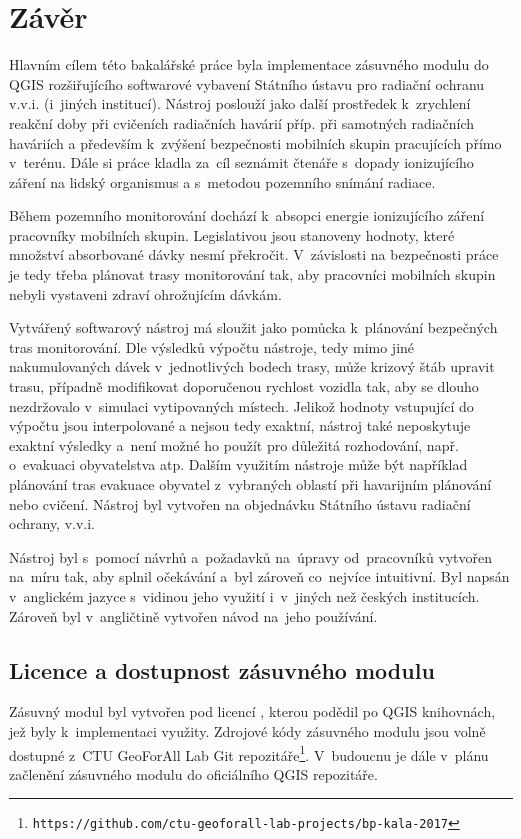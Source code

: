 \chapter{Závěr}
\label{5-zaver}

Hlavním cílem této bakalářské práce byla implementace zásuvného modulu
do QGIS rozšiřujícího softwarové vybavení Státního ústavu pro radiační
ochranu v.v.i. (i~jiných institucí). Nástroj poslouží jako další
prostředek k~zrychlení reakční doby při cvičeních radiačních havárií
příp. při samotných radiačních haváriích a především k~zvýšení
bezpečnosti mobilních skupin pracujících přímo v~terénu. Dále si práce
kladla za~cíl seznámit čtenáře s~dopady ionizujícího záření na lidský
organismus a s~metodou pozemního snímání radiace.

Během pozemního monitorování dochází
k~absopci energie ionizujícího záření pracovníky mobilních skupin. 
Legislativou jsou
stanoveny hodnoty, které množství absorbované dávky nesmí
překročit. V~závislosti na bezpečnosti práce je tedy třeba plánovat
trasy monitorování tak, aby pracovníci mobilních skupin nebyli vystaveni zdraví
ohrožujícím dávkám.

Vytvářený softwarový nástroj má sloužit jako pomůcka k~plánování bezpečných tras
monitorování. Dle výsledků výpočtu nástroje, tedy mimo jiné
nakumulovaných dávek v~jednotlivých bodech trasy, může krizový štáb
upravit trasu, případně mo\-difikovat doporučenou rychlost vozidla tak,
aby se dlouho nezdržovalo v~simulaci vytipovaných 
místech. Jelikož hodnoty vstupující do výpočtu jsou interpolované a
nejsou tedy exaktní, nástroj také neposkytuje exaktní výsledky a~není
možné ho použít pro důležitá rozhodování, např. o~evakuaci
obyvatelstva atp. Dalším využitím nástroje může být například
plánování tras evakuace obyvatel z~vybraných oblastí při havarijním
plánování nebo cvičení. Nástroj byl vytvořen na objednávku Státního
ústavu radiační ochrany, v.v.i.

Nástroj byl s~pomocí návrhů a~požadavků na~úpravy od~pracovníků
 vytvořen na~míru tak, aby splnil očekávání a~byl zároveň 
co~nejvíce intuitivní. Byl napsán v~anglickém jazyce s~vidinou
jeho využití i~v~jiných než českých institucích. Zároveň byl
v~angličtině vytvořen návod na~jeho používání.

\section{Licence a dostupnost zásuvného modulu} Zásuvný modul byl
vytvořen pod licencí , kterou podědil po QGIS knihovnách,
jež byly k~implementaci využity. Zdrojové kódy zásuvného modulu jsou
volně dostupné z~CTU GeoForAll Lab Git
repozitáře\footnote{\texttt{https://github.com/ctu-geoforall-lab-projects/bp-kala-2017}}. V~budoucnu
je dále v~plánu začlenění zásuvného modulu do oficiálního QGIS
repozitáře.

 



